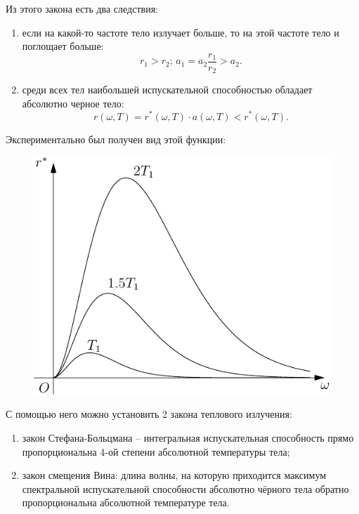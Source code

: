 \documentclass{hedexams}
\begin{document}
Из этого закона есть два следствия:
\begin{enumerate}
    \item если на какой-то частоте тело излучает больше, то на этой частоте тело
        и поглощает больше:
        \[
            r_1 > r_2;\, a_1 = a_2\frac{r_1}{r_2} > a_2.
        \]
    \item среди всех тел наибольшей испускательной способностью обладает
        абсолютно черное тело:
        \[
            r(\omega, T) = r^*(\omega, T)\cdot a(\omega, T) < r^*(\omega, T).
        \]
\end{enumerate}

Экспериментально был получен вид этой функции:
\begin{figure}[h!]
    \center
    \includegraphics[width=.47\textwidth]{01-plank}
\end{figure}

С помощью него можно установить 2 закона теплового излучения:
\begin{enumerate}
    \item закон Стефана-Больцмана -- интегральная испускательная способность
        прямо пропорциональна 4-ой степени абсолютной температуры тела;
    \item закон смещения Вина: длина волны, на которую приходится максимум
        спектральной испускательной способности абсолютно чёрного тела обратно
        пропорциональна абсолютной температуре тела.
\end{enumerate}
\end{document}
